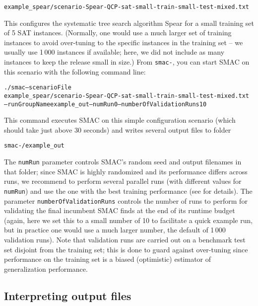 \documentclass[11pt,letterpaper,twoside]{article}
\begin{document}
{\footnotesize
\begin{alltt}
example_spear/scenario-Spear-QCP-sat-small-train-small-test-mixed.txt
\end{alltt}}

This configures the systematic tree search algorithm Spear for a small training set of 5 SAT instances.
(Normally, one would use a much larger set of training instances to avoid over-tuning to the specific instances in the training set -- we usually use 1\,000 instances if available; here, we did not include as many instances to keep the release small in size.)
%
From \texttt{smac-}\unskip, you can start SMAC on this scenario with the following command line:

{\footnotesize
\begin{alltt}
./smac --scenarioFile 
example_spear/scenario-Spear-QCP-sat-small-train-small-test-mixed.txt
--runGroupName example_out --numRun 0 --numberOfValidationRuns 10
\end{alltt}}

This command executes SMAC on this simple configuration scenario (which should take just above 30 seconds) and writes several output files to folder

{\footnotesize
\begin{alltt}
smac-\version\unskip/example_out
\end{alltt}}

The \texttt{numRun} parameter controls SMAC's random seed and output filenames in that folder; since SMAC is highly randomized and its performance differs across runs, we recommend to perform several parallel runs (with different values for \texttt{numRun}) and use the one with the best training performance (see \cite{HutHooLey12-ParallelAC} for details).
The parameter \texttt{numberOfValidationRuns} controls the number of runs to perform for validating the final incumbent SMAC finds at the end of its runtime budget (again, here we set this to a small number of 10 to facilitate a quick example run, but in practice one would use a much larger number, \eg{} the default of 1\,000 validation runs). Note that validation runs are carried out on a benchmark test set disjoint from the training set; this is done to guard against over-tuning since performance on the training set is a biased (optimistic) estimator of generalization performance.

\subsection{Interpreting output files}
\end{document}
